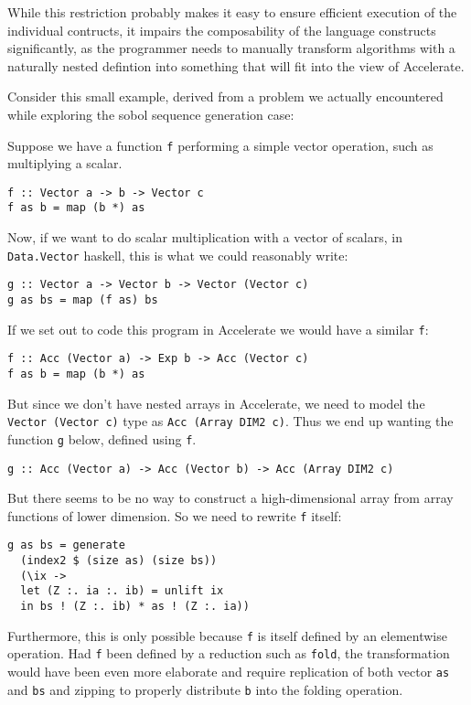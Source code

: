 While this restriction probably makes it easy to ensure efficient execution of
the individual contructs, it impairs the composability of the language
constructs significantly, as the programmer needs to manually transform
algorithms with a naturally nested defintion into something that will fit into
the view of Accelerate.

Consider this small example, derived from a problem we actually encountered
while exploring the sobol sequence generation case:

Suppose we have a function \texttt{f} performing a simple vector operation,
such as multiplying a scalar.

\begin{verbatim}
f :: Vector a -> b -> Vector c
f as b = map (b *) as
\end{verbatim}

Now, if we want to do scalar multiplication with a vector of scalars, in
\texttt{Data.Vector} haskell, this is what we could reasonably write:

\begin{verbatim}
g :: Vector a -> Vector b -> Vector (Vector c)
g as bs = map (f as) bs
\end{verbatim}

If we set out to code this program in Accelerate we would have a similar
\texttt{f}:

\begin{verbatim}
f :: Acc (Vector a) -> Exp b -> Acc (Vector c)
f as b = map (b *) as
\end{verbatim}

But since we don't have nested arrays in Accelerate, we need to model the
\texttt{Vector (Vector c)} type  as \texttt{Acc (Array DIM2 c)}. Thus we end up
wanting the function \texttt{g} below, defined using \texttt{f}.

\begin{verbatim}
g :: Acc (Vector a) -> Acc (Vector b) -> Acc (Array DIM2 c)
\end{verbatim}

But there seems to be no way to construct a high-dimensional array from array
functions of lower dimension. So we need to rewrite \texttt{f} itself:

\begin{verbatim}
g as bs = generate
  (index2 $ (size as) (size bs))
  (\ix ->
  let (Z :. ia :. ib) = unlift ix
  in bs ! (Z :. ib) * as ! (Z :. ia))
\end{verbatim}

Furthermore, this is only possible because \texttt{f} is itself defined by an
elementwise operation. Had \texttt{f} been defined by a reduction such as
\texttt{fold}, the transformation would have been even more elaborate and
require replication of both vector \texttt{as} and \texttt{bs} and zipping to
properly distribute \texttt{b} into the folding operation.

